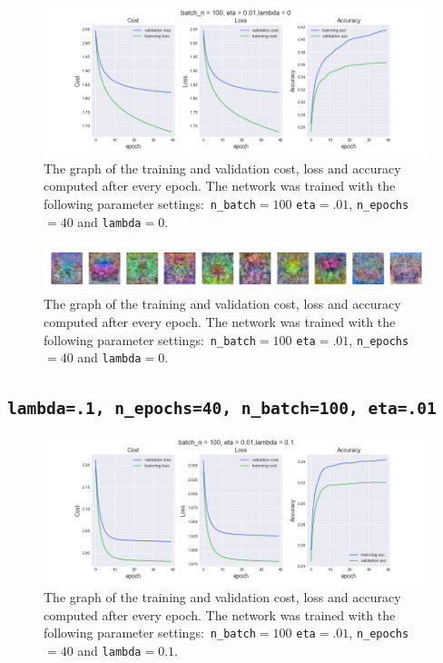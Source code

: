 \documentclass[11pt]{article}
\begin{document}
\begin{figure}[H]
	\centerline{\includegraphics[width=195mm,scale=0.7]{lamda_0_eta_001.png}}
		\caption{The graph of the training and validation cost, loss and accuracy computed after every epoch. The network was trained with the following parameter settings$:$ \texttt{n\_batch}$=100$ \texttt{eta}$=.01$, \texttt{n\_epochs}$=40$ and  \texttt{lambda}$=0$.}
	\label{fig:2}
\end{figure}

\begin{figure}[H]
	\centerline{\includegraphics[width=200mm,scale=0.5]{lamda_0_eta_001_ct.png}}
	\caption{The graph of the training and validation cost, loss and accuracy computed after every epoch. The network was trained with the following parameter settings$:$ \texttt{n\_batch}$=100$ \texttt{eta}$=.01$, \texttt{n\_epochs}$=40$ and  \texttt{lambda}$=0$.}
	\label{fig:2.1}
\end{figure}

\subsection{\texttt{lambda=.1, n\_epochs=40, n\_batch=100, eta=.01}}\label{1.3}
\begin{figure}[H]
	\centerline{\includegraphics[width=195mm,scale=0.7]{lamda_01_eta_001.png}}
	\caption{The graph of the training and validation cost, loss and accuracy computed after every epoch. The network was trained with the following parameter settings$:$ \texttt{n\_batch}$=100$ \texttt{eta}$=.01$, \texttt{n\_epochs}$=40$ and  \texttt{lambda}$=0.1$.}
	\label{fig:3}
\end{figure}
\end{document}
